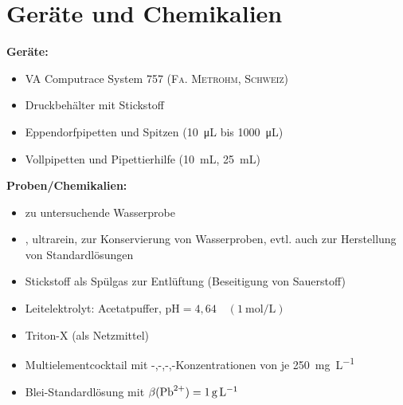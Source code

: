 \newpage
\section{Geräte und Chemikalien}
\label{sec:geraete}

\textbf{Geräte:}
\begin{itemize}
	\item VA Computrace System 757 (\textsc{Fa. Metrohm, Schweiz})
	\item Druckbehälter mit Stickstoff
	\item Eppendorfpipetten und Spitzen (\SI{10}{\micro\liter} bis \SI{1000}{\micro\liter})
	\item Vollpipetten und Pipettierhilfe (\SI{10}{\milli\liter}, \SI{25}{\milli\liter})
\end{itemize}

\vspace*{5mm}

\textbf{Proben/Chemikalien:}
\begin{itemize}
	\item zu untersuchende Wasserprobe
	\item {}, ultrarein, zur Konservierung von Wasserproben, evtl. auch zur Herstellung von Standardlösungen
	\item Stickstoff als Spülgas zur Entlüftung (Beseitigung von Sauerstoff)
	\item Leitelektrolyt: Acetatpuffer, pH$=4,64 \quad \left(\SI{1}{\mol\per\liter}\right)$
	\item Triton-X (als Netzmittel)
	\item Multielementcocktail mit -,-,-,-Konzentrationen von je \SI{250}{\milli \gram\per \liter}
	\item Blei-Standardlösung mit $\beta(\ce{Pb^{2+}})=\SI{1}{\gram\per\liter}$
\end{itemize}





